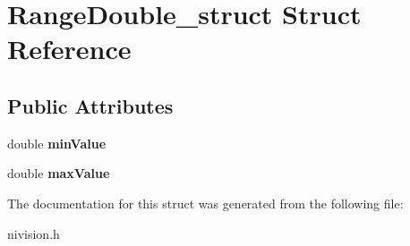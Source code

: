 \hypertarget{structRangeDouble__struct}{
\section{RangeDouble\_\-struct Struct Reference}
\label{structRangeDouble__struct}
}
\subsection*{Public Attributes}
\begin{DoxyCompactItemize}
\item 
\hypertarget{structRangeDouble__struct_a21894bcaf21ec60dc3a99e9ee6bc280f}{
double {\bfseries minValue}}
\label{structRangeDouble__struct_a21894bcaf21ec60dc3a99e9ee6bc280f}

\item 
\hypertarget{structRangeDouble__struct_afa2f6a4e5d0082933cc79e4921b220d6}{
double {\bfseries maxValue}}
\label{structRangeDouble__struct_afa2f6a4e5d0082933cc79e4921b220d6}

\end{DoxyCompactItemize}


The documentation for this struct was generated from the following file:\begin{DoxyCompactItemize}
\item 
nivision.h\end{DoxyCompactItemize}
